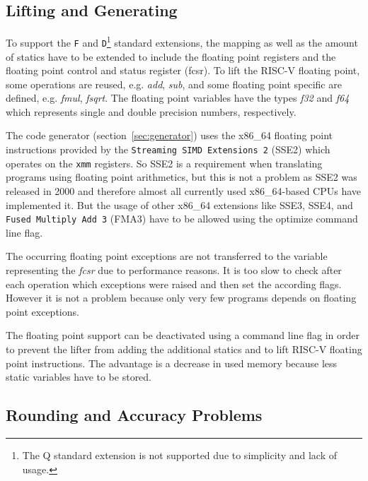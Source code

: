 \documentclass[course=eragp]{aspdoc}
\begin{document}
\subsection{Lifting and Generating}

To support the \texttt{F} and \texttt{D}\footnote{The Q standard extension is not supported due to simplicity and lack of usage.}
standard extensions, the mapping as well as the amount of statics have to be extended to include the
floating point registers and the floating point control and status register (fcsr). To lift the
RISC-V floating point, some operations are reused, e.g. \emph{add}, \emph{sub}, and some floating
point specific are defined, e.g. \emph{fmul}, \emph{fsqrt}. The floating point variables have the
types \emph{f32} and \emph{f64} which represents single and double precision numbers, respectively.

\par

The code generator (section~\ref{sec:generator}) uses the x86\_64 floating point instructions provided by the
\texttt{Streaming SIMD Extensions 2} (SSE2) which operates on the \texttt{xmm} registers. So SSE2 is
a requirement when translating programs using floating point arithmetics, but this is not a problem
as SSE2 was released in 2000 and therefore almost all currently used x86\_64-based CPUs have
implemented it. But the usage of other x86\_64 extensions like SSE3, SSE4, and \texttt{Fused Multiply
    Add 3} (FMA3) have to be allowed using the optimize command line flag.

\par

The occurring floating point exceptions are not transferred to the variable representing the
\emph{fcsr} due to performance reasons. It is too slow to check after each operation which
exceptions were raised and then set the according flags. However it is not a problem because only
very few programs depends on floating point exceptions.

\par

The floating point support can be deactivated using a command line flag in order
to prevent the lifter from adding the additional statics and to lift RISC-V floating point
instructions. The advantage is a decrease in used memory because less static variables have to be
stored.

\subsection{Rounding and Accuracy Problems}
\end{document}
